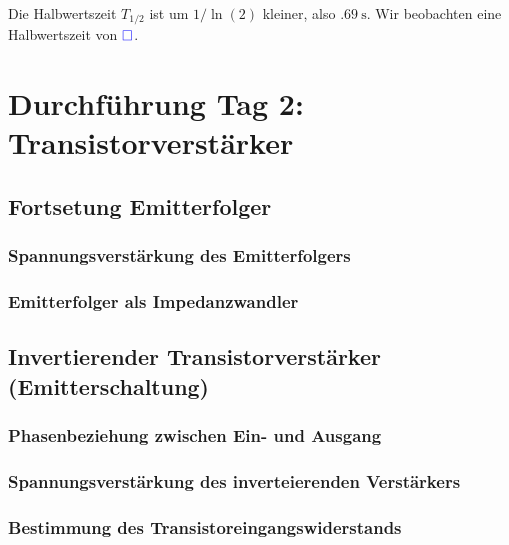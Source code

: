 Die Halbwertszeit $T_{1/2}$ ist um $1/\ln(2)$ kleiner, also $\SI{.69}\second$.
Wir beobachten eine Halbwertszeit von $\textcolor{blue}{\square}$. \fehlt

\fehlt


\FloatBarrier
\section{Durchführung Tag 2: Transistorverstärker}

\subsection{Fortsetung Emitterfolger}

\subsubsection{Spannungsverstärkung des Emitterfolgers}

\fehlt

\subsubsection{Emitterfolger als Impedanzwandler}

\fehlt

\subsection{Invertierender Transistorverstärker (Emitterschaltung)}

\subsubsection{Phasenbeziehung zwischen Ein- und Ausgang}

\fehlt

\subsubsection{Spannungsverstärkung des inverteierenden Verstärkers}

\fehlt

\subsubsection{Bestimmung des Transistoreingangswiderstands}

